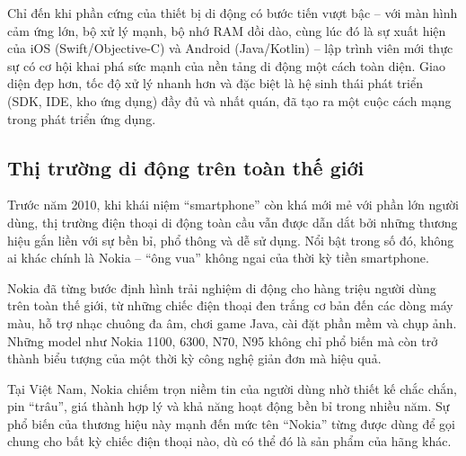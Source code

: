 \begin{flushleft}
\hspace*{0.8cm}Chỉ đến khi phần cứng của thiết bị di động có bước tiến vượt bậc – với màn hình cảm ứng lớn, bộ xử lý mạnh, bộ nhớ RAM dồi dào, cùng lúc đó là sự xuất hiện của iOS (Swift/Objective-C) và Android (Java/Kotlin) – lập trình viên mới thực sự có cơ hội khai phá sức mạnh của nền tảng di động một cách toàn diện. Giao diện đẹp hơn, tốc độ xử lý nhanh hơn và đặc biệt là hệ sinh thái phát triển (SDK, IDE, kho ứng dụng) đầy đủ và nhất quán, đã tạo ra một cuộc cách mạng trong phát triển ứng dụng.
\end{flushleft}

\subsection{Thị trường di động trên toàn thế giới}
\renewcommand{\labelitemi}{--}    
\begin{flushleft}
  \hspace*{0.8cm}Trước năm 2010, khi khái niệm “smartphone” còn khá mới mẻ với phần lớn người dùng, thị trường điện thoại di động toàn cầu vẫn được dẫn dắt bởi những thương hiệu gắn liền với sự bền bỉ, phổ thông và dễ sử dụng. Nổi bật trong số đó, không ai khác chính là Nokia – “ông vua” không ngai của thời kỳ tiền smartphone.
  \end{flushleft}
  
  \begin{flushleft}
  \hspace*{0.8cm}Nokia đã từng bước định hình trải nghiệm di động cho hàng triệu người dùng trên toàn thế giới, từ những chiếc điện thoại đen trắng cơ bản đến các dòng máy màu, hỗ trợ nhạc chuông đa âm, chơi game Java, cài đặt phần mềm và chụp ảnh. Những model như Nokia 1100, 6300, N70, N95 không chỉ phổ biến mà còn trở thành biểu tượng của một thời kỳ công nghệ giản đơn mà hiệu quả.
  \end{flushleft}
  
  \begin{flushleft}
  \hspace*{0.8cm}Tại Việt Nam, Nokia chiếm trọn niềm tin của người dùng nhờ thiết kế chắc chắn, pin “trâu”, giá thành hợp lý và khả năng hoạt động bền bỉ trong nhiều năm. Sự phổ biến của thương hiệu này mạnh đến mức tên “Nokia” từng được dùng để gọi chung cho bất kỳ chiếc điện thoại nào, dù có thể đó là sản phẩm của hãng khác.
  \end{flushleft}
  
